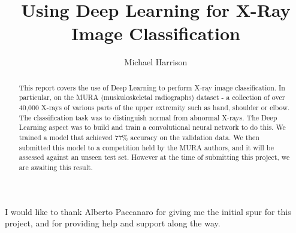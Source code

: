 \documentclass[11pt]{article} %
\title{Using Deep Learning for X-Ray Image Classification}
\author{Michael Harrison}
\theoremstyle{plain}
\theoremstyle{definition}
\begin{document}
\maketitle

\declaration

\begin{acknowledgement}
I would like to thank Alberto Paccanaro for giving me the initial spur for this project, and for providing help and support along the way.
\end{acknowledgement}

\begin{abstract}
This report covers the use of Deep Learning to perform X-ray image classification. In particular, on the MURA (muskuloskeletal radiographs) dataset - a collection of over 40,000 X-rays of various parts of the upper extremity such as hand, shoulder or elbow. The classification task was to distinguish normal from abnormal X-rays. The Deep Learning aspect was to build and train a convolutional neural network to do this. We trained a model that achieved 77\% accuracy on the validation data. We then submitted this model to a competition held by the MURA authors, and it will be assessed against an unseen test set. However at the time of submitting this project, we are awaiting this result.
\end{abstract}


\newpage
\setcounter{page}{1}
\end{document}
